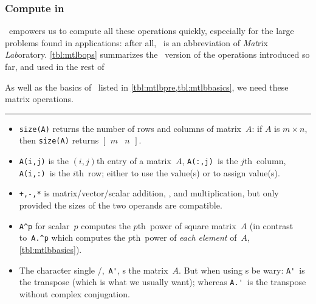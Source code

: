 





\subsubsection{Compute in \script}

\script\ empowers us to compute all these operations quickly, especially for the large problems found in applications: after all, \script[1]\ is an abbreviation of \emph{Mat}rix \emph{Lab}oratory.
\cref{tbl:mtlbops} summarizes the \script\ version of the operations introduced so far, and used in the rest of 

\begin{table}
\caption{As well as the basics of \script\ listed in \cref{tbl:mtlbpre,tbl:mtlbbasics},  we need these matrix operations.} \label{tbl:mtlbops}
\hrule
\begin{minipage}{\linewidth}
\begin{itemize}
\item {}\verb|size(A)| returns the number of rows and columns of matrix~\(A\): if \(A\) is \(m\times n\), then \verb|size(A)| returns \(\begin{bmatrix} m&n \end{bmatrix}\).
\item \verb|A(i,j)| is the \((i,j)\)th entry of a matrix~\(A\), \verb|A(:,j)|~is the \(j\)th~column, \verb|A(i,:)|~is the \(i\)th~row; either to use the value(s) or to assign value(s).
\item {}\verb|+,-,*| is matrix\slash vector\slash scalar addition, , and multiplication, but only provided the sizes of the two operands are compatible.
\item \verb|A^p| for scalar~\(p\) computes the \(p\)th~power of square matrix~\(A\) (in contrast to~\verb|A.^p| which  computes the \(p\)th~power of \emph{each element} of~\(A\), \cref{tbl:mtlbbasics}).
\item The character single \slash{},~\verb|A'|, s the matrix~\(A\).  
But when using s be wary: \verb|A'|~is the  transpose (which is what we usually want); whereas \verb|A.'|~is the transpose without complex conjugation.

\end{itemize}
\end{minipage}
\end{table}
